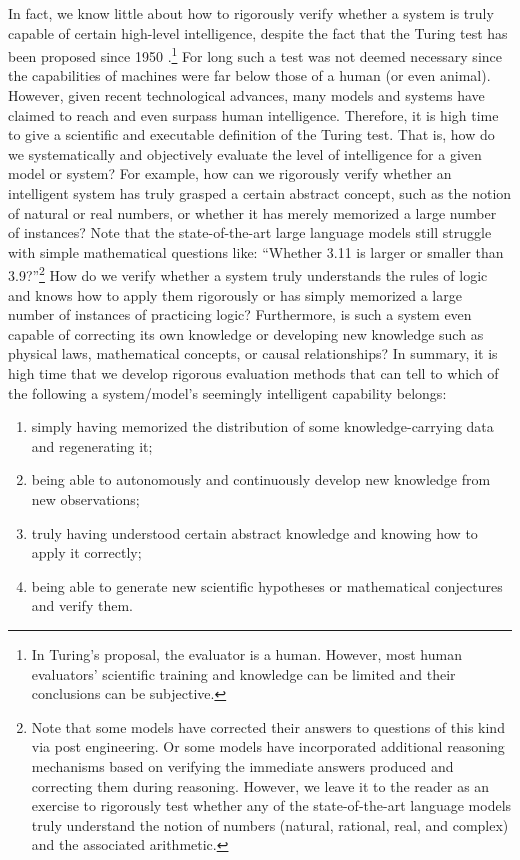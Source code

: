 \documentclass[../../book-main.tex]{subfiles}
\begin{document}
In fact, we know little about how to rigorously verify whether a system is truly capable of certain high-level intelligence, despite the fact that the Turing test has been proposed since 1950 \cite{Turing-1950}.\footnote{In Turing's proposal, the evaluator is a human. However, most human evaluators' scientific training and knowledge can be limited and their conclusions can be subjective.} For long such a test was not deemed necessary since the capabilities of machines were far below those of a human (or even animal). However, given recent technological advances, many models and systems have claimed to reach and even surpass human intelligence. Therefore, it is high time to give a scientific and executable definition of the Turing test. That is, how do we systematically and objectively evaluate the level of intelligence for a given model or system? For example, how can we rigorously verify whether an intelligent system has truly grasped a certain abstract concept, such as the notion of natural or real numbers, or whether it has merely memorized a large number of instances? Note that the state-of-the-art large language models still struggle with simple mathematical questions like: ``Whether 3.11 is larger or smaller than 3.9?''\footnote{Note that some models have corrected their answers to questions of this kind via post engineering. Or some models have incorporated additional reasoning mechanisms based on verifying the immediate answers produced and correcting them during reasoning. However, we leave it to the reader as an exercise to rigorously test whether any of the state-of-the-art language models truly understand the notion of numbers (natural, rational, real, and complex) and the associated arithmetic.} 
How do we verify whether a system truly understands the rules of logic and knows how to apply them rigorously or has simply memorized a large number of instances of practicing logic? Furthermore, is such a system even capable of correcting its own knowledge or developing new knowledge such as physical laws, mathematical concepts, or causal relationships? In summary, it is high time that we develop rigorous evaluation methods that can tell to which of the following a system/model's seemingly intelligent capability belongs: 
\begin{enumerate}
    \item simply having memorized the distribution of some knowledge-carrying data and regenerating it;
    \item being able to autonomously and continuously develop new knowledge from new observations;
    \item truly having understood certain abstract knowledge and knowing how to apply it correctly;
    \item being able to generate new scientific hypotheses or mathematical conjectures and verify them.
\end{enumerate}
\end{document}
